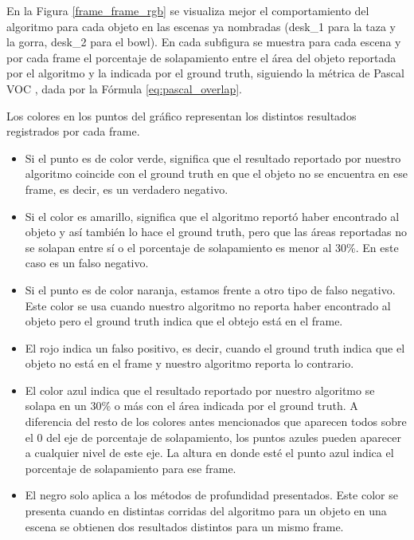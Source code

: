 En la Figura \ref{frame_frame_rgb} se visualiza mejor el comportamiento del algoritmo para cada objeto en las escenas ya nombradas (desk\_1 para la taza y la gorra, desk\_2 para el bowl). En cada subfigura se muestra para cada escena y por cada frame el porcentaje de solapamiento entre el área del objeto reportada por el algoritmo y la indicada por el ground truth, siguiendo la métrica de Pascal VOC \cite{everinghampascal}, dada por la Fórmula \ref{eq:pascal_overlap}.

Los colores en los puntos del gráfico representan los distintos resultados registrados por cada frame.
\begin{itemize}
	\item Si el punto es de color verde, significa que el resultado reportado por nuestro algoritmo coincide con el ground truth en que el objeto no se encuentra en ese frame, es decir, es un verdadero negativo.
	\item Si el color es amarillo, significa que el algoritmo reportó haber encontrado al objeto y así también lo hace el ground truth, pero que las áreas reportadas no se solapan entre sí o el porcentaje de solapamiento es menor al 30\%. En este caso es un falso negativo.
	\item Si el punto es de color naranja, estamos frente a otro tipo de falso negativo. Este color se usa cuando nuestro algoritmo no reporta haber encontrado al objeto pero el ground truth indica que el obtejo está en el frame.
	\item El rojo indica un falso positivo, es decir, cuando el ground truth indica que el objeto no está en el frame y nuestro algoritmo reporta lo contrario.
	\item El color azul indica que el resultado reportado por nuestro algoritmo se solapa en un 30\% o más con el área indicada por el ground truth. A diferencia del resto de los colores antes mencionados que aparecen todos sobre el 0 del eje de porcentaje de solapamiento, los puntos azules pueden aparecer a cualquier nivel de este eje. La altura en donde esté el punto azul indica el porcentaje de solapamiento para ese frame.
	\item El negro solo aplica a los métodos de profundidad presentados. Este color se presenta cuando en distintas corridas del algoritmo para un objeto en una escena se obtienen dos resultados distintos para un mismo frame.
\end{itemize}

